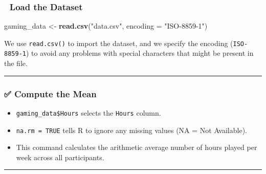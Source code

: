 \documentclass[
]{book}
\newenvironment{Shaded}{\begin{snugshade}}{\end{snugshade}}
\newcommand{\AttributeTok}[1]{\textcolor[rgb]{0.13,0.29,0.53}{#1}}
\newcommand{\ConstantTok}[1]{\textcolor[rgb]{0.56,0.35,0.01}{#1}}
\newcommand{\FunctionTok}[1]{\textcolor[rgb]{0.13,0.29,0.53}{\textbf{#1}}}
\newcommand{\NormalTok}[1]{#1}
\newcommand{\OtherTok}[1]{\textcolor[rgb]{0.56,0.35,0.01}{#1}}
\newcommand{\SpecialCharTok}[1]{\textcolor[rgb]{0.81,0.36,0.00}{\textbf{#1}}}
\newcommand{\StringTok}[1]{\textcolor[rgb]{0.31,0.60,0.02}{#1}}
\providecommand{\tightlist}{%
  \setlength{\itemsep}{0pt}\setlength{\parskip}{0pt}}
\begin{document}
\subsubsection*{📂 Load the Dataset}\label{load-the-dataset}

\begin{Shaded}
\begin{Highlighting}[]
\NormalTok{gaming\_data }\OtherTok{\textless{}{-}} \FunctionTok{read.csv}\NormalTok{(}\StringTok{"data.csv"}\NormalTok{, }\AttributeTok{encoding =} \StringTok{"ISO{-}8859{-}1"}\NormalTok{)}
\end{Highlighting}
\end{Shaded}

We use \texttt{read.csv()} to import the dataset, and we specify the encoding (\texttt{ISO-8859-1}) to avoid any problems with special characters that might be present in the file.

\begin{center}\rule{0.5\linewidth}{0.5pt}\end{center}

\subsubsection*{✅ Compute the Mean}\label{compute-the-mean}

\begin{Shaded}
\end{Shaded}

\begin{itemize}
\tightlist
\item
  \texttt{gaming\_data\$Hours} selects the \texttt{Hours} column.
\item
  \texttt{na.rm\ =\ TRUE} tells R to ignore any missing values (NA = Not Available).
\item
  This command calculates the arithmetic average number of hours played per week across all participants.
\end{itemize}

\begin{center}\rule{0.5\linewidth}{0.5pt}\end{center}
\end{document}
